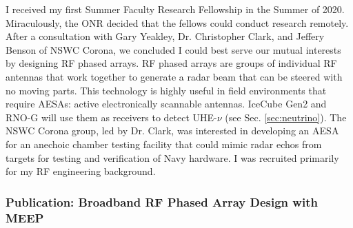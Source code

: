 \documentclass[../../../main.tex]{subfiles}
\begin{document}
I received my first Summer Faculty Research Fellowship in the Summer of 2020.  Miraculously, the ONR decided that the fellows could conduct research remotely.  After a consultation with Gary Yeakley, Dr. Christopher Clark, and Jeffery Benson of NSWC Corona, we concluded I could best serve our mutual interests by designing RF phased arrays.  RF phased arrays are groups of individual RF antennas that work together to generate a radar beam that can be steered with no moving parts.  This technology is highly useful in field environments that require AESAs: active electronically scannable antennas.  IceCube Gen2 and RNO-G will use them as receivers to detect UHE-$\nu$ (see Sec. \ref{sec:neutrino}).  The NSWC Corona group, led by Dr. Clark, was interested in developing an AESA for an anechoic chamber testing facility that could mimic radar echos from targets for testing and verification of Navy hardware.  I was recruited primarily for my RF engineering background.

\subsubsection{Publication: Broadband RF Phased Array Design with MEEP}
\end{document}
